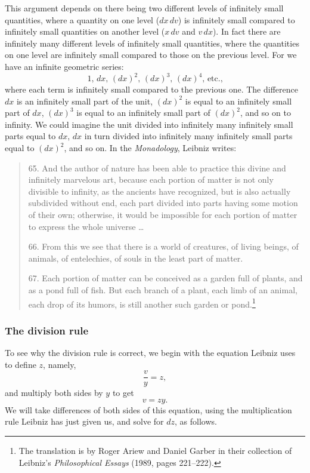 \documentclass[polutonikogreek,english,twoside,openright]{article}
\begin{document}
\label{levels} This argument depends on there being two different
levels of infinitely small quantities, where a quantity on one level
($dx\,dv$) is infinitely small compared to infinitely small quantities
on another level ($x\,dv$ and $v\,dx$).  In fact there are infinitely
many different levels of infinitely small quantities, where the
quantities on one level are infinitely small compared to those on the
previous level.  For we have an infinite geometric series:
$$1,\, dx,\, (dx)^2,\, (dx)^3,\, (dx)^4,\, \mbox{etc.,}$$
where each term is infinitely small compared to the previous one.  The
difference $dx$ is an infinitely small part of the unit, $(dx)^2$ is
equal to an infinitely small part of $dx$, $(dx)^3$ is equal to an
infinitely small part of $(dx)^2$, and so on to infinity.  We could
imagine the unit divided into infinitely many infinitely small parts
equal to $dx$, $dx$ in turn divided into infinitely many infinitely
small parts equal to $(dx)^2$, and so on.  In the {\em Monadology},
Leibniz writes:
\begin{quotation}
  65. And the author of nature has been able to practice this divine
  and infinitely marvelous art, because each portion of matter is not
  only divisible to infinity, as the ancients have recognized, but is
  also actually subdivided without end, each part divided into parts
  having some motion of their own; otherwise, it would be impossible
  for each portion of matter to express the whole universe \ldots

  66. From this we see that there is a world of creatures, of living
  beings, of animals, of entelechies, of souls in the least part of
  matter.

  67. Each portion of matter can be conceived as a garden full of
  plants, and as a pond full of fish.  But each branch of a plant,
  each limb of an animal, each drop of its humors, is still another
  such garden or pond.\footnote{The translation is by Roger Ariew and
    Daniel Garber in their collection of Leibniz's {\em Philosophical
      Essays} (1989, pages 221--222).}
\end{quotation}

\subsubsection*{The division rule}


To see why the division rule is correct, we begin with the equation
Leibniz uses to define $z$, namely,
$$\frac{v}{y} = z ,$$
and multiply both sides by $y$ to get
$$v= zy.$$
We will take differences of both sides of this equation, using the
multiplication rule Leibniz has just given us, and solve for $dz$, as
follows.
\end{document}
